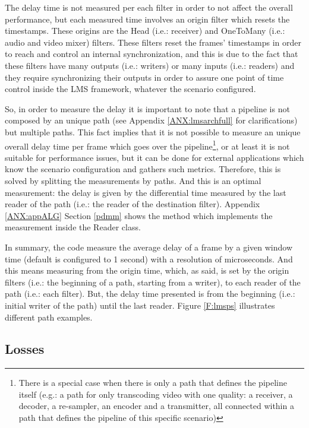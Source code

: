 The delay time is not measured per each filter in order to not affect the overall performance, but each measured time involves an origin filter which resets the timestamps. These origins are the Head (i.e.: receiver) and OneToMany (i.e.: audio and video mixer) filters. These filters reset the frames' timestamps in order to reach and control an internal synchronization, and this is due to the fact that these filters have many outputs (i.e.: writers) or many inputs (i.e.: readers) and they require synchronizing their outputs in order to assure one point of time control inside the LMS framework, whatever the scenario configured.

So, in order to measure the delay it is important to note that a pipeline is not composed by an unique path (see Appendix \ref{ANX:lmsarchfull} for clarifications) but multiple paths. This fact implies that it is not possible to measure an unique overall delay time per frame which goes over the pipeline\footnote{There is a special case when there is only a path that defines the pipeline itself (e.g.: a path for only transcoding video with one quality: a receiver, a decoder, a re-sampler, an encoder and a transmitter, all connected within a path that defines the pipeline of this specific scenario)}, or at least it is not suitable for performance issues, but it can be done for external applications which know the scenario configuration and gathers such metrics. Therefore, this is solved by splitting the measurements by paths. And this is an optimal measurement: the delay is given by the differential time measured by the last reader of the path (i.e.: the reader of the destination filter). Appendix \ref{ANX:appALG} Section \ref{pdmm} shows the method which implements the measurement inside the Reader class.

In summary, the code measure the average delay of a frame by a given window time (default is configured to 1 second) with a resolution of microseconds. And this means measuring from the origin time, which, as said, is set by the origin filters (i.e.: the beginning of a path, starting from a writer), to each reader of the path (i.e.: each filter). But, the delay time presented is from the beginning (i.e.: initial writer of the path) until the last reader. Figure \ref{F:lmsps} illustrates different path examples.

\subsection{Losses}

